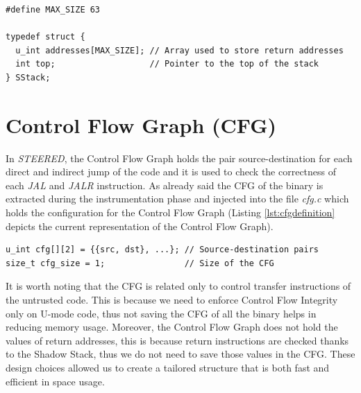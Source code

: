 \begin{lstlisting}[style=CStyle, caption = Shadow Stack definition inside \textit{shadow\_stack.c}, label={lst:ss}]
#define MAX_SIZE 63

typedef struct {
  u_int addresses[MAX_SIZE]; // Array used to store return addresses
  int top;                   // Pointer to the top of the stack
} SStack;
\end{lstlisting}

\section{Control Flow Graph (CFG)}
\label{sec:project_cfg}

In \textit{STEERED}, the Control Flow Graph holds the pair source-destination for
each direct and indirect jump of the code and it is used to check the correctness
of each \textit{JAL} and \textit{JALR} instruction. As already said the CFG of
the binary is extracted during the instrumentation phase and injected into the
file \textit{cfg.c} which holds the configuration for the Control Flow Graph (Listing
\ref{lst:cfgdefinition} depicts the current representation of the Control Flow
Graph).

\begin{lstlisting}[style=CStyle, caption= Definition of the Control Flow Graph inside \textit{cfg.c}, label={lst:cfgdefinition}]
u_int cfg[][2] = {{src, dst}, ...}; // Source-destination pairs
size_t cfg_size = 1;                // Size of the CFG
\end{lstlisting}

It is worth noting that the CFG is related only to control transfer instructions
of the untrusted code. This is because we need to enforce Control Flow Integrity
only on U-mode code, thus not saving the CFG of all the binary helps in reducing
memory usage. Moreover, the Control Flow Graph does not hold the values of
return addresses, this is because return instructions are checked thanks to the Shadow
Stack, thus we do not need to save those values in the CFG. These design choices
allowed us to create a tailored structure that is both fast and efficient in space
usage.

